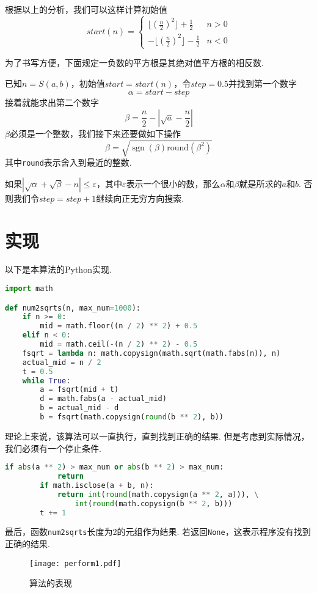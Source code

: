 \documentclass[a4paper, UTF8]{ctexart}
\DeclareMathOperator{\sgn}{\mathrm{sgn}}
\begin{document}
根据以上的分析，我们可以这样计算初始值
\[
    start(n)=
    \begin{cases}
        \lfloor(\frac{n}{2})^2\rfloor+\frac{1}{2}  &n>0 \\
        -\lfloor(\frac{n}{2})^2\rfloor-\frac{1}{2} &n<0
    \end{cases}
\]

为了书写方便，下面规定一负数的平方根是其绝对值平方根的相反数.

已知$n=S(a,b)$，初始值$start=start(n)$，令$step=0.5$并找到第一个数字\[\alpha=start-step\]接着就能求出第二个数字\[\beta=\frac{n}{2}-|\sqrt{a}-\frac{n}{2}|\]$\beta$必须是一个整数，我们接下来还要做如下操作\[\beta=\sqrt{\sgn(\beta)\mathrm{round}(\beta^2)}\]其中\verb|round|表示舍入到最近的整数.

如果$|\sqrt{\alpha}+\sqrt{\beta}-n|\leq\varepsilon$，其中$\varepsilon$表示一个很小的数，那么$\alpha$和$\beta$就是所求的$a$和$b$. 否则我们令$step=step+1$继续向正无穷方向搜索.

\section{实现}
以下是本算法的Python实现.

\begin{lstlisting}[language=python, name=example1]
import math

def num2sqrts(n, max_num=1000):
    if n >= 0:
        mid = math.floor((n / 2) ** 2) + 0.5
    elif n < 0:
        mid = math.ceil(-(n / 2) ** 2) - 0.5
    fsqrt = lambda n: math.copysign(math.sqrt(math.fabs(n)), n)
    actual_mid = n / 2
    t = 0.5
    while True:
        a = fsqrt(mid + t)
        d = math.fabs(a - actual_mid)
        b = actual_mid - d
        b = fsqrt(math.copysign(round(b ** 2), b))
\end{lstlisting}
理论上来说，该算法可以一直执行，直到找到正确的结果. 但是考虑到实际情况，我们必须有一个停止条件.
\begin{lstlisting}[language=python, name=example1]
        if abs(a ** 2) > max_num or abs(b ** 2) > max_num:
            return
        if math.isclose(a + b, n):
            return int(round(math.copysign(a ** 2, a))), \
                int(round(math.copysign(b ** 2, b)))
        t += 1
\end{lstlisting}
最后，函数\verb|num2sqrts|长度为2的元组作为结果. 若返回\verb|None|，这表示程序没有找到正确的结果.

\begin{figure}[tb]
    \centering
    \texttt{[image: perform1.pdf]}
    \caption{算法的表现}
    \label{fig:perform1}
\end{figure}
\end{document}
